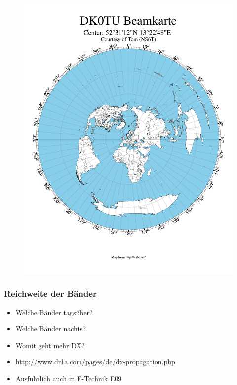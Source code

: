 \begin{frame}
  \begin{center}
    \begin{figure}
      \includegraphics[height=\textheight,height=.85\textheight,keepaspectratio]{a08/AzimuthalMap.pdf}
    \end{figure}
  \end{center}
\end{frame}

\begin{frame}
  \frametitle{Reichweite der Bänder}
  \begin{center}
    \begin{itemize}
      \item Welche Bänder tagsüber?
      \item Welche Bänder nachts?
      \item Womit geht mehr DX?
      \item \ExternalLink \url{http://www.dr1a.com/pages/de/dx-propagation.php}
      \item Ausführlich auch in E-Technik E09
    \end{itemize}
  \end{center}
\end{frame}

